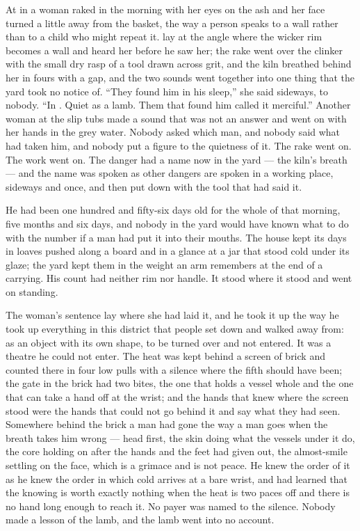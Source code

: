 
At  in  a woman raked in the morning with her eyes on the ash and her face turned a little away from the basket, the way a person speaks to a wall rather than to a child who might repeat it.  lay at the angle where the wicker rim becomes a wall and heard her before he saw her; the rake went over the clinker with the small dry rasp of a tool drawn across grit, and the kiln breathed behind her in fours with a gap, and the two sounds went together into one thing that the yard took no notice of. “They found him in his sleep,” she said sideways, to nobody. “In . Quiet as a lamb. Them that found him called it merciful.” Another woman at the slip tubs made a sound that was not an answer and went on with her hands in the grey water. Nobody asked which man, and nobody said what had taken him, and nobody put a figure to the quietness of it. The rake went on. The work went on. The danger had a name now in the yard --- the kiln's breath --- and the name was spoken as other dangers are spoken in a working place, sideways and once, and then put down with the tool that had said it.

He had been one hundred and fifty-six days old for the whole of that morning, five months and six days, and nobody in the yard would have known what to do with the number if a man had put it into their mouths. The house kept its days in loaves pushed along a board and in a glance at a jar that stood cold under its glaze; the yard kept them in the weight an arm remembers at the end of a carrying. His count had neither rim nor handle. It stood where it stood and went on standing.

The woman's sentence lay where she had laid it, and he took it up the way he took up everything in this district that people set down and walked away from: as an object with its own shape, to be turned over and not entered. It was a theatre he could not enter. The heat was kept behind a screen of brick and counted there in four low pulls with a silence where the fifth should have been; the gate in the brick had two bites, the one that holds a vessel whole and the one that can take a hand off at the wrist; and the hands that knew where the screen stood were the hands that could not go behind it and say what they had seen. Somewhere behind the brick a man had gone the way a man goes when the breath takes him wrong --- head first, the skin doing what the vessels under it do, the core holding on after the hands and the feet had given out, the almost-smile settling on the face, which is a grimace and is not peace. He knew the order of it as he knew the order in which cold arrives at a bare wrist, and had learned that the knowing is worth exactly nothing when the heat is two paces off and there is no hand long enough to reach it. No payer was named to the silence. Nobody made a lesson of the lamb, and the lamb went into no account.

